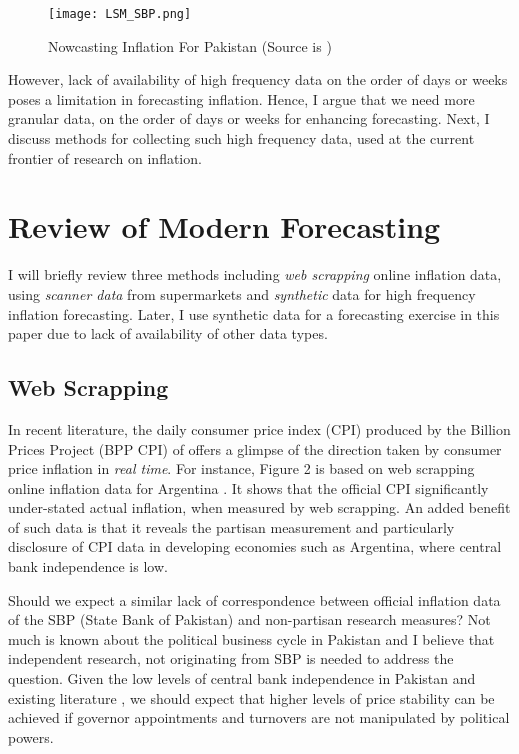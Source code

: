 \documentclass[12pt]{article}
\newcommand{\1}{\mathbbm 1}
\begin{document}
		
		\begin{figure}[H]
			\begin{Center}
				\texttt{[image: LSM\_SBP.png]}
				\caption{Nowcasting Inflation For Pakistan (Source is \cite{hussain2018nowcasting})}
			\end{Center}
		\end{figure}
		
		
		However, lack of availability of high frequency data on the order of days or weeks poses a limitation in forecasting inflation. Hence, I argue that we need more granular data, on the order of days or weeks for enhancing forecasting. Next, I discuss methods for collecting such high frequency data, used at the current frontier of research on inflation.
		
		
		
		
		
		
		
		
		\section{Review of Modern Forecasting}
		
		I will briefly review three methods including \textit{web scrapping} online inflation data, using \textit{scanner data} from supermarkets and \textit{synthetic} data for high frequency inflation forecasting. Later, I use synthetic data for a forecasting exercise in this paper due to lack of availability of other data types.
		
		\subsection{Web Scrapping}
		
		
		In recent literature, the daily consumer price index (CPI) produced by the Billion Prices Project (BPP CPI) of \cite{cavallo2016billion} offers a glimpse of the direction taken by consumer price inflation in \textit{real time}. For instance, Figure 2 is based on web scrapping online inflation data for Argentina \cite{cavallo2016billion}. It shows that the official CPI significantly under-stated actual inflation, when measured by web scrapping. An added benefit of such data is that it reveals the partisan measurement and particularly disclosure of CPI data in developing economies such as Argentina, where central bank independence is low. 
		
		Should we expect a similar lack of correspondence between official inflation data of the SBP (State Bank of Pakistan) and non-partisan research measures? Not much is known about the political business cycle in Pakistan and I believe that independent research, not originating from SBP is needed to address the question. Given the low levels of central bank independence in Pakistan and existing literature \cite{vuletin2011replacing}, we should expect that higher levels of price stability can be achieved if governor appointments and turnovers are not manipulated by political powers. 
		
\end{document}
